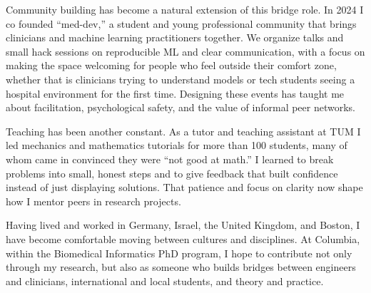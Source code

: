\documentclass[11pt,a4paper]{article}
\begin{document}
Community building has become a natural extension of this bridge role. In 2024 I co founded “med-dev,” a student and young professional community that brings clinicians and machine learning practitioners together. We organize talks and small hack sessions on reproducible ML and clear communication, with a focus on making the space welcoming for people who feel outside their comfort zone, whether that is clinicians trying to understand models or tech students seeing a hospital environment for the first time. Designing these events has taught me about facilitation, psychological safety, and the value of informal peer networks.

Teaching has been another constant. As a tutor and teaching assistant at TUM I led mechanics and mathematics tutorials for more than 100 students, many of whom came in convinced they were “not good at math.” I learned to break problems into small, honest steps and to give feedback that built confidence instead of just displaying solutions. That patience and focus on clarity now shape how I mentor peers in research projects.

Having lived and worked in Germany, Israel, the United Kingdom, and Boston, I have become comfortable moving between cultures and disciplines. At Columbia, within the Biomedical Informatics PhD program, I hope to contribute not only through my research, but also as someone who builds bridges between engineers and clinicians, international and local students, and theory and practice.
\end{document}
